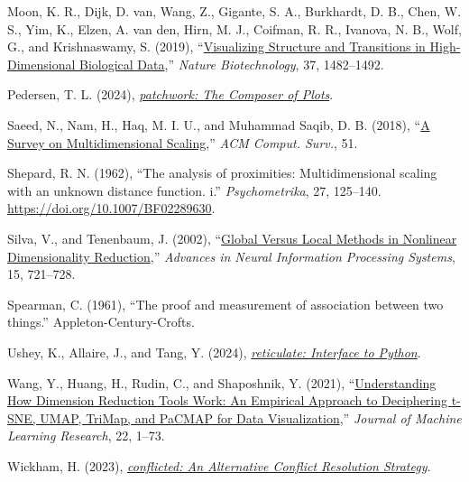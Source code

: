 \documentclass[
  11pt,
  a4paper,
]{report}
\newlength{\cslhangindent}
\newenvironment{CSLReferences}[2] %
 {\begin{list}{}{%
  \setlength{\itemindent}{0pt}
  \setlength{\leftmargin}{0pt}
  \setlength{\parsep}{0pt}
  \ifodd #1
   \setlength{\leftmargin}{\cslhangindent}
   \setlength{\itemindent}{-1\cslhangindent}
  \fi
  \setlength{\itemsep}{#2\baselineskip}}}
 {\end{list}}
\begin{document}
\begin{CSLReferences}{1}{0}
Moon, K. R., Dijk, D. van, Wang, Z., Gigante, S. A., Burkhardt, D. B.,
Chen, W. S., Yim, K., Elzen, A. van den, Hirn, M. J., Coifman, R. R.,
Ivanova, N. B., Wolf, G., and Krishnaswamy, S. (2019),
{``\href{/url\%7Bhttps://doi.org/10.1038/s41587-019-0336-3\%7D.}{{Visualizing
Structure and Transitions in High-Dimensional Biological Data}},''}
\emph{Nature Biotechnology}, 37, 1482--1492.

Pedersen, T. L. (2024),
\emph{\href{/url\%7Bhttps://CRAN.R-project.org/package=patchwork\%7D.}{{patchwork:
The Composer of Plots}}}.

Saeed, N., Nam, H., Haq, M. I. U., and Muhammad Saqib, D. B. (2018),
{``\href{/url\%7Bhttps://doi.org/10.1145/3178155\%7D.}{{A Survey on
Multidimensional Scaling}},''} \emph{ACM Comput. Surv.}, 51.

Shepard, R. N. (1962), {``The analysis of proximities: Multidimensional
scaling with an unknown distance function. i.''} \emph{Psychometrika},
27, 125--140. \url{https://doi.org/10.1007/BF02289630}.

Silva, V., and Tenenbaum, J. (2002),
{``\href{/url\%7Bhttps://proceedings.neurips.cc/paper_files/paper/2002/file/5d6646aad9bcc0be55b2c82f69750387-Paper.pdf\%7D.}{{Global
Versus Local Methods in Nonlinear Dimensionality Reduction}},''}
\emph{Advances in Neural Information Processing Systems}, 15, 721--728.

Spearman, C. (1961), {``The proof and measurement of association between
two things.''} Appleton-Century-Crofts.

Ushey, K., Allaire, J., and Tang, Y. (2024),
\emph{\href{/url\%7Bhttps://CRAN.R-project.org/package=reticulate\%7D.}{{reticulate:
Interface to Python}}}.

Wang, Y., Huang, H., Rudin, C., and Shaposhnik, Y. (2021),
{``\href{/url\%7Bhttp://jmlr.org/papers/v22/20-1061.html\%7D.}{{Understanding
How Dimension Reduction Tools Work: An Empirical Approach to Deciphering
t-SNE, UMAP, TriMap, and PaCMAP for Data Visualization}},''}
\emph{Journal of Machine Learning Research}, 22, 1--73.

Wickham, H. (2023),
\emph{\href{/url\%7Bhttps://CRAN.R-project.org/package=conflicted\%7D.}{{conflicted:
An Alternative Conflict Resolution Strategy}}}.


\end{CSLReferences}
\end{document}
